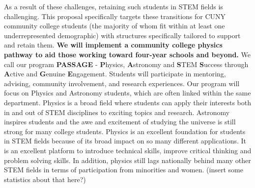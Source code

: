 \documentclass[12pt]{article}
\begin{document}
As a result of these challenges, retaining such students in STEM fields is challenging.
This proposal specifically targets these transitions for CUNY community college students (the majority of whom fit within at least one underrepresented demographic) with structures specifically tailored to support and retain them.
{\bf We will implement a community college physics pathway to aid those working toward four-year schools and beyond.} We call our program {\bf PASSAGE} - {\bf P}hysics, {\bf A}stronomy and {\bf S}TEM {\bf S}uccess through {\bf A}ctive and {\bf G}enuine {\bf E}ngagement.  Students will participate in mentoring, advising, community involvement, and research experiences.  Our program will focus on Physics and Astronomy students, which are often linked within the same department.  %
Physics is a broad field where students can apply their interests both in and out of STEM disciplines to exciting topics and research. Astronomy inspires students and the awe and excitement of studying the universe is still strong for many college students.  Physics is an excellent foundation for students in STEM fields because of its broad impact on so many different applications. It is an excellent platform to introduce technical skills, improve critical thinking and problem solving skills.  In addition, physics still lags nationally behind many other STEM fields in terms of participation from minorities and women.  (insert some statistics about that here?)
\end{document}
